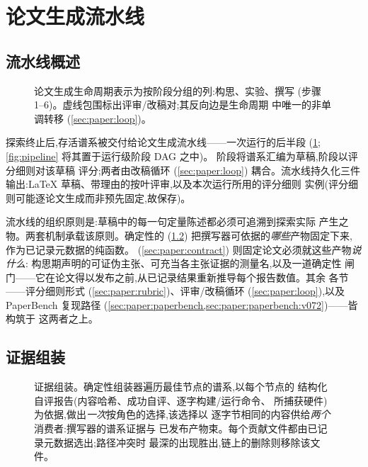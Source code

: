 \section{论文生成流水线}\label{sec:paper}

\subsection{流水线概述}\label{sec:paper:overview}

\begin{figure}[t]
  \centering
  \resizebox{\columnwidth}{!}{}
  \caption{论文生成生命周期表示为按阶段分组的列:构思、实验、撰写
           (步骤 1--6)。虚线包围标出评审/改稿对;其反向边是生命周期
           中唯一的非单调转移
           (\cref{sec:paper:loop})。}
  \label{fig:swim}
\end{figure}

探索终止后,存活谱系被交付给论文生成流水线——一次运行的后半段
(\cref{fig:swim};\cref{fig:pipeline} 将其置于运行级阶段 DAG 之中)。
阶段将谱系汇编为草稿,阶段以评分细则对该草稿
评分;两者由改稿循环 (\cref{sec:paper:loop}) 耦合。流水线持久化三件
输出:\LaTeX{} 草稿、带理由的按叶评审,以及本次运行所用的评分细则
实例(评分细则可能逐论文生成而非预先固定,故保存)。

流水线的组织原则是:草稿中的每一句定量陈述都必须可追溯到探索实际
产生之物。两套机制承载该原则。确定性的
(\cref{sec:paper:evidence}) 把撰写器可依据的\emph{哪些}产物固定下来,
作为已记录元数据的纯函数。
(\cref{sec:paper:contract}) 则固定论文必须就这些产物\emph{说什么}:
构思期声明的可证伪主张、可充当各主张证据的测量名,以及一道确定性
闸门——它在论文得以发布之前,从已记录结果重新推导每个报告数值。其余
各节——评分细则形式 (\cref{sec:paper:rubric})、评审/改稿循环
(\cref{sec:paper:loop}),以及 PaperBench 复现路径
(\cref{sec:paper:paperbench,sec:paper:paperbench:v072})——皆构筑于
这两者之上。

\subsection{证据组装}\label{sec:paper:evidence}

\begin{figure}[t]
  \centering
  \resizebox{\columnwidth}{!}{}
  \caption{证据组装。确定性组装器遍历最佳节点的谱系,以每个节点的
           结构化自评报告(内容哈希、成功自评、逐字构建/运行命令、
           所捕获硬件)为依据,做出\emph{一次}按角色的选择,该选择以
           逐字节相同的内容供给\emph{两个}消费者:撰写器的谱系证据与
           已发布产物束。每个贡献文件都由已记录元数据选出;路径冲突时
           最深的出现胜出,链上的删除则移除该文件。}
  \label{fig:evidence}
\end{figure}

